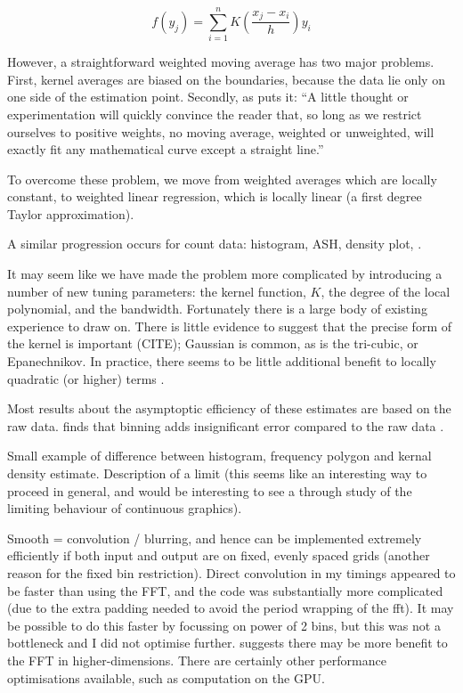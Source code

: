 \documentclass[journal]{vgtc}                %
\begin{document}
\[
  f(y_j) = \sum_{i = 1}^n K( \frac{x_j - x_i}{h} ) y_i 
\]

However, a straightforward weighted moving average has two major problems. First, kernel averages are biased on the boundaries, because the data lie only on one side of the estimation point.  Secondly, as \citep{macaulay:1931} puts it: ``A little thought or experimentation will quickly convince the reader that, so long as we restrict ourselves to positive weights, no moving average, weighted or unweighted, will exactly fit any mathematical curve except a straight line.''

To overcome these problem, we move from weighted averages which are locally constant, to weighted linear regression, which is locally linear (a first degree Taylor approximation).  

A similar progression occurs for count data: histogram, ASH, density plot, .

It may seem like we have made the problem more complicated by introducing a number of new tuning parameters: the kernel function, $K$, the degree of the local polynomial, and the bandwidth. Fortunately there is a large body of existing experience to draw on. There is little evidence to suggest that the precise form of the kernel is important (CITE); Gaussian is common, as is the tri-cubic, or Epanechnikov. In practice, there seems to be little additional benefit to locally quadratic (or higher) terms \citep{cleveland:1996}.

Most results about the asymptoptic efficiency of these estimates are based on the raw data. \cite{wand:1994} finds that binning adds insignificant error compared to the raw data .

Small example of difference between histogram, frequency polygon and kernal density estimate.  Description of a limit (this seems like an interesting way to proceed in general, and would be interesting to see a through study of the limiting behaviour of continuous graphics).


Smooth = convolution / blurring, and hence can be implemented extremely efficiently if both input and output are on fixed, evenly spaced grids (another reason for the fixed bin restriction). Direct convolution in my timings appeared to be faster than using the FFT, and the code was substantially more complicated (due to the extra padding needed to avoid the period wrapping of the fft).  It may be possible to do this faster by focussing on power of 2 bins, but this was not a bottleneck and I did not optimise further. \citep{wand:1994} suggests there may be more benefit to the FFT in higher-dimensions. There are certainly other performance optimisations available, such as computation on the GPU.
\end{document}
